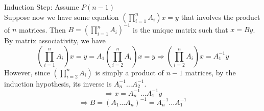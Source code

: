 \documentclass[12pt]{article}
\begin{document}
Induction Step: Assume $P(n - 1)$\\
Suppose now we have some equation $(\prod_{i = 1}^n A_i) x = y$ that involves the product of $n$ matrices. Then $B = (\prod_{i = 1}^n A_i)^{-1}$ is the unique matrix such that $x = By$. By matrix associativity, we have $$(\prod_{i = 1}^n A_i) x = y = A_1 (\prod_{i = 2}^n A_i) x = y \Rightarrow (\prod_{i = 2}^n A_i) x = A_1^{-1} y$$
However, since $(\prod_{i = 2}^n A_i)$ is simply a product of $n - 1$ matrices, by the induction hypothesis, its inverse is $A_n^{-1} \dots A_2^{-1}$.
$$\Rightarrow x = A_n^{-1} \dots A_1^{-1} y$$
$$\Rightarrow B = (A_1 \dots A_n)^{-1} = A_n^{-1} \dots A_1^{-1}$$
\end{document}
